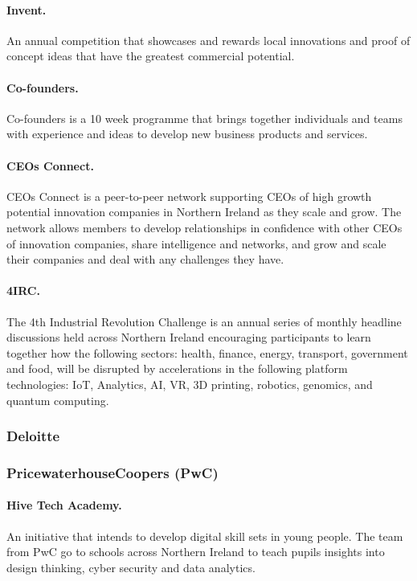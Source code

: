 \paragraph{Invent.} An annual competition that showcases and rewards local innovations and proof of concept ideas that have the greatest commercial potential.

\paragraph{Co-founders.} Co-founders is a 10 week programme that brings together individuals and teams with experience and ideas to develop new business products and services.

\paragraph{CEOs Connect.} CEOs Connect is a peer-to-peer network supporting CEOs of high growth potential innovation companies in Northern Ireland as they scale and grow. The network allows members to develop relationships in confidence with other CEOs of innovation companies, share intelligence and networks, and grow and scale their companies and deal with any challenges they have.

\paragraph{4IRC.} The 4th Industrial Revolution Challenge is an annual series of monthly headline discussions held across Northern Ireland encouraging participants to learn together how the following sectors: health, finance, energy, transport, government and food, will be disrupted by accelerations in the following platform technologies: IoT, Analytics, AI, VR, 3D printing, robotics, genomics, and quantum computing. 

\subsubsection{Deloitte}

\subsubsection{PricewaterhouseCoopers (PwC)}

\paragraph{Hive Tech Academy.} An initiative that intends to develop digital skill sets in young people. The team from PwC go to schools across Northern Ireland to teach pupils insights into design thinking, cyber security and data analytics.

